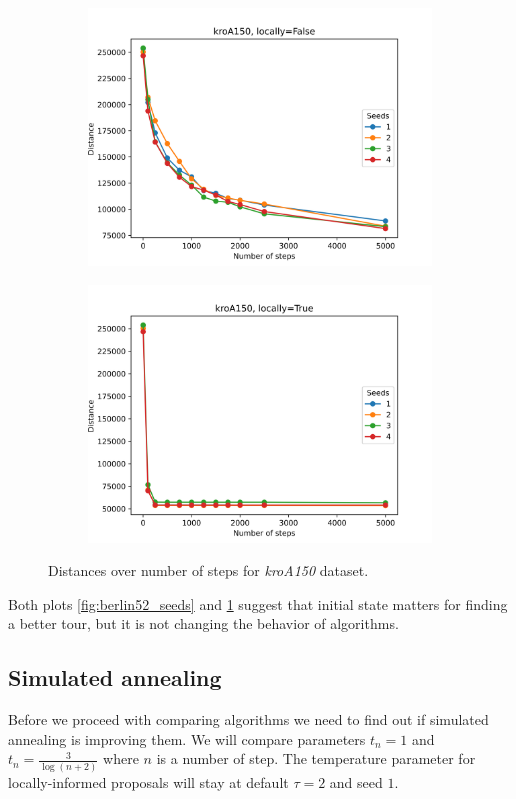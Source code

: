 	\begin{figure}[!htb]
		\centering
		\begin{subfigure}{0.45\textwidth}
			\includegraphics[width=\textwidth]{plots/kroA150_seeds_locally=False}
		\end{subfigure}
		\begin{subfigure}{0.45\textwidth}
			\includegraphics[width=\textwidth]{plots/kroA150_seeds_locally=True}
		\end{subfigure}
		\caption{Distances over number of steps for \textit{kroA150} dataset.}
		\label{fig:kroA150_seeds}
	\end{figure}

	Both plots \ref{fig:berlin52_seeds} and \ref{fig:kroA150_seeds} suggest that initial state matters for finding a better tour, but it is not changing the behavior of algorithms.
	
\subsection{Simulated annealing}
	Before we proceed with comparing algorithms we need to find out if simulated annealing is improving them. We will compare parameters $t_n=1$ and $t_n= \frac{3}{\log(n+2)}$ where $n$ is a number of step. The temperature parameter for locally-informed proposals will stay at default $\tau=2$ and seed $1$.